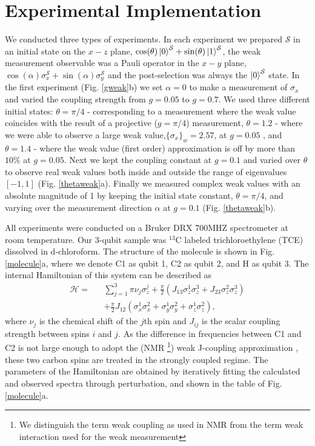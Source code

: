 \documentclass[aps,pra,12pt,onecolumn,showpacs,superscriptaddress,floatfix,footinbib,subfigure]{revtex4}
\def\ket#1{\mathinner{|{#1}\rangle}}
\def\es{{\mathcal{S}}}
\begin{document}
\section{Experimental Implementation}

 We conducted three types of experiments.  In each  experiment we prepared $\es$   in  an initial state on the $x-z$ plane, $\cos(\theta)\ket{0}^\es+\sin(\theta)\ket{1}^\es$, the weak measurement observable was a Pauli operator  in the $x-y$ plane, $\cos(\alpha)\sigma_x^\es+\sin(\alpha)\sigma_y^\es$ and the post-selection was always the $\ket{0}^\es$ state. In the first experiment (Fig. \ref{gweak}b) we set $\alpha=0$ to make a measurement of $\sigma_x$ and varied the coupling strength from $g=0.05$  to $g=0.7$. We used three different initial states: $\theta=\pi/4$ - corresponding to a measurement where the weak value coincides with the result of a projective ($g=\pi/4$) measurement, $\theta=1.2$ -  where we were able to observe a large weak value,$\{\sigma_x\}_w=2.57$, at $g=0.05$ ,  and $\theta=1.4$ - where the weak value (first order) approximation is off by more than $10\%$ at $g=0.05$.  Next we kept the coupling constant at $g=0.1$ and varied over $\theta$  to observe real weak values both inside and outside the range of eigenvalues $[-1,1]$ (Fig. \ref{thetaweak}a). Finally we measured complex weak values with an absolute magnitude of 1 by keeping the initial state constant, $\theta=\pi/4$, and varying over the measurement direction $\alpha$ at $g=0.1$ (Fig. \ref{thetaweak}b).

 All experiments were conducted on a Bruker DRX 700MHZ spectrometer at room temperature. Our 3-qubit sample  was  $^{13}$C labeled trichloroethylene (TCE) dissolved in d-chloroform. The structure of the molecule is shown in Fig. \ref{molecule}a, where we denote C1 as qubit 1, C2 as qubit 2, and H as qubit 3. The internal Hamiltonian of this system can be described as
\begin{eqnarray}\label{Hamiltonian}
\mathcal{H}=&&\sum\limits_{j=1}^3 {\pi \nu _j } \sigma _z^j  + \frac{\pi}{2}(J_{13}\sigma _z^1 \sigma _z^3+J_{23}\sigma _z^2 \sigma _z^3) \nonumber\\
&&+ \frac{\pi}{2}J_{12} (\sigma _x^1 \sigma _x^2+\sigma _y^1 \sigma _y^2+\sigma _z^1 \sigma _z^2),
\end{eqnarray}
where $\nu_j$ is the chemical shift of the $j$th spin and $J_{ij}$ is the scalar coupling strength between spins $i$ and $j$. As the difference in frequencies between C1 and C2 is not large enough to adopt the (NMR \footnote{We distinguish the term weak coupling as used in NMR from the term weak interaction used for the weak measurement}) weak J-coupling  approximation \cite{nmrreview}, these two carbon spins are treated in the strongly coupled regime. The parameters of the Hamiltonian are obtained by iteratively fitting the calculated and observed spectra through perturbation, and shown in the table of Fig. \ref{molecule}a.
\end{document}
